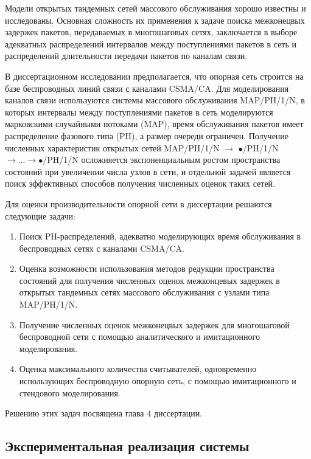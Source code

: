 Модели открытых тандемных сетей массового обслуживания хорошо известны и исследованы. Основная сложность их применения к задаче поиска межконецвых задержек пакетов, передаваемых в многошаговых сетях, заключается в выборе адекватных распределений интервалов между поступлениями пакетов в сеть и распределений длительности передачи пакетов по каналам связи.

В диссертационном исследовании предполагается, что опорная сеть строится на базе беспроводных линий связи с каналами CSMA/CA. Для моделирования каналов связи используются системы массового обслуживания MAP/PH/1/N, в которых интервалы между поступлениями пакетов в сеть моделируются марковскими случайными потоками (MAP), время обслуживания пакетов имеет распределение фазового типа (PH), а размер очереди ограничен. Получение численных характеристик открытых сетей MAP/PH/1/N $\rightarrow$ $\bullet$/PH/1/N $\rightarrow \dots \rightarrow \bullet$/PH/1/N осложняется экспоненциальным ростом пространства состояний при увеличении числа узлов в сети, и отдельной задачей является поиск эффективных способов получения численных оценок таких сетей.

Для оценки производительности опорной сети в диссертации решаются следующие задачи:

\begin{enumerate}
    \item Поиск PH-распределений, адекватно моделирующих время обслуживания в беспроводных сетях с каналами CSMA/CA.
    \item Оценка возможности использования методов редукции пространства состояний для получения численных оценок межконцевых задержек в открытых тандемных сетях массового обслуживания с узлами типа MAP/PH/1/N.
    \item Получение численных оценок межконецвых задержек для многошаговой беспроводной сети с помощью аналитического и имитационного моделирования.
    \item Оценка максимального количества считывателей, одновременно использующих беспроводную опорную сеть, с помощью имитационного и стендового моделирования.
\end{enumerate}

Решению этих задач посвящена глава 4 диссертации.


\subsection{Экспериментальная реализация системы}

